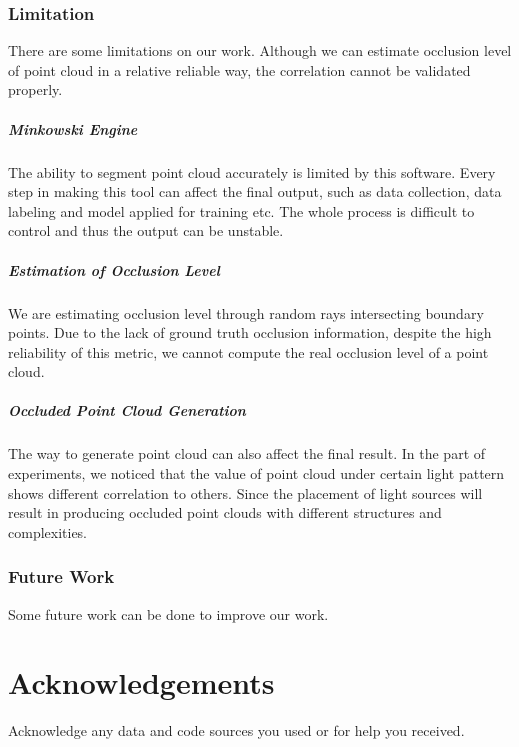 \documentclass[11pt, a4paper,oneside,chapterprefix=false]{scrbook}
\begin{document}
\subsection{Limitation}

There are some limitations on our work. Although we can estimate occlusion level of point cloud in a relative reliable way, the correlation cannot be validated properly. 

\paragraph{Minkowski Engine}

The ability to segment point cloud accurately is limited by this software. Every step in making this tool can affect the final output, such as data collection, data labeling and model applied for training etc. The whole process is difficult to control and thus the output can be unstable. 

\paragraph{Estimation of Occlusion Level}

We are estimating occlusion level through random rays intersecting boundary points. Due to the lack of ground truth occlusion information, despite the high reliability of this metric, we cannot compute the real occlusion level of a point cloud.

\paragraph{Occluded Point Cloud Generation}

The way to generate point cloud can also affect the final result. In the part of experiments, we noticed that the value of point cloud under certain light pattern shows different correlation to others. Since the placement of light sources will result in producing occluded point clouds with different structures and complexities.

\subsection{Future Work}

Some future work can be done to improve our work.

\chapter{Acknowledgements} \label{chp:acknowledgements}

Acknowledge any data and code sources you used or for help you received.



\end{document}
